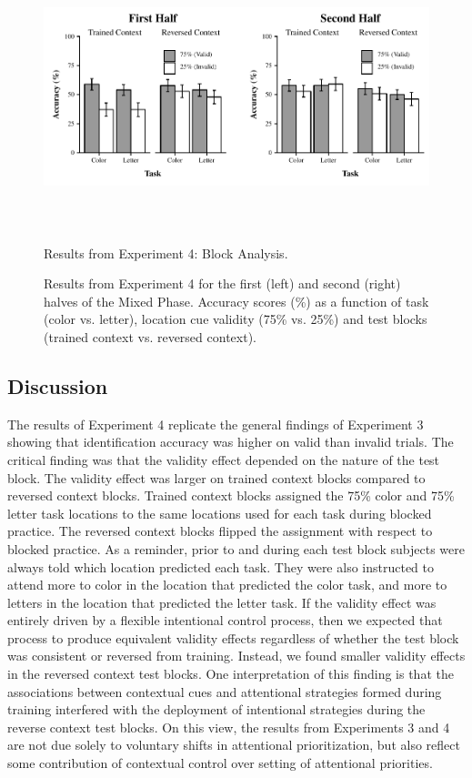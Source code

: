 \documentclass[]{DissertateCUNY}
\begin{document}
\begin{figure}
  \centering
  \includegraphics[height=3in]{figures/ICfigure6.pdf}
  \caption{Results from Experiment 4: Block Analysis.}
  \caption*{Results from Experiment 4 for the first (left) and second (right) halves of the Mixed Phase. Accuracy scores (\%) as a function of task (color vs. letter), location cue validity (75\% vs. 25\%) and test blocks (trained context vs. reversed context).}
  \label{IC_figure6}
\end{figure}

\hypertarget{discussion-3}{%
\subsection{Discussion}\label{discussion-3}}

The results of Experiment 4 replicate the general findings of Experiment
3 showing that identification accuracy was higher on valid than invalid
trials. The critical finding was that the validity effect depended on
the nature of the test block. The validity effect was larger on trained
context blocks compared to reversed context blocks. Trained context
blocks assigned the 75\% color and 75\% letter task locations to the
same locations used for each task during blocked practice. The reversed
context blocks flipped the assignment with respect to blocked practice.
As a reminder, prior to and during each test block subjects were always
told which location predicted each task. They were also instructed to
attend more to color in the location that predicted the color task, and
more to letters in the location that predicted the letter task. If the
validity effect was entirely driven by a flexible intentional control
process, then we expected that process to produce equivalent validity
effects regardless of whether the test block was consistent or reversed
from training. Instead, we found smaller validity effects in the
reversed context test blocks. One interpretation of this finding is that
the associations between contextual cues and attentional strategies
formed during training interfered with the deployment of intentional
strategies during the reverse context test blocks. On this view, the
results from Experiments 3 and 4 are not due solely to voluntary shifts
in attentional prioritization, but also reflect some contribution of
contextual control over setting of attentional priorities.
\end{document}
